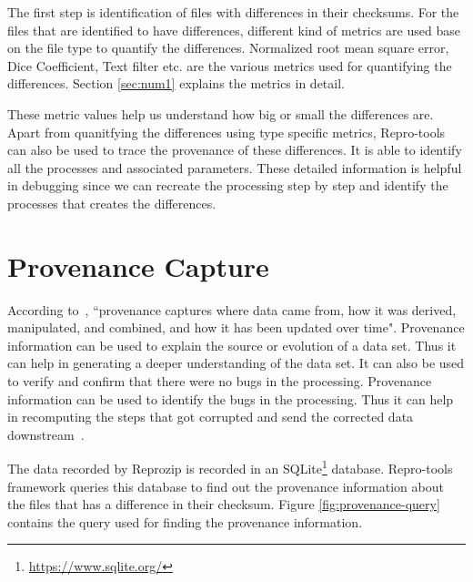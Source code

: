 The first step is identification of files with differences in their checksums. For the files that are identified to have differences, different kind of metrics are used base on the file type to quantify the differences. Normalized root mean square error, Dice Coefficient, Text filter etc. are the various metrics used for quantifying the differences. Section \ref{sec:num1} explains the metrics in detail. 

These metric values help us understand how big or small the differences are. Apart from quanitfying the differences using type specific metrics, Repro-tools can also be used to trace the provenance of these differences. It is able to identify all the processes and associated parameters. These detailed information is helpful in debugging since we can recreate the processing step by step and identify the processes that creates the differences.


\section{Provenance Capture}
According to~\cite{Ikeda:2010:PSP:1855795.1855800}, ``provenance captures where data came from, how it was derived, manipulated, and combined, and how it has been updated over time". Provenance information can be used to explain the source or evolution of a data set. Thus it can help in generating a deeper understanding of the data set. It can also be used to verify and confirm that there were no bugs in the processing. Provenance information can be used to identify the bugs in the processing. Thus it can help in recomputing the steps that got corrupted and send the corrected data downstream~\cite{Ikeda:2010:PSP:1855795.1855800}.

The data recorded by Reprozip is recorded in an SQLite\footnote{\url{https://www.sqlite.org/}} database. Repro-tools framework queries this database to find out the provenance information about the files that has a difference in their checksum. Figure \ref{fig:provenance-query} contains the query used for finding the provenance information.\\

